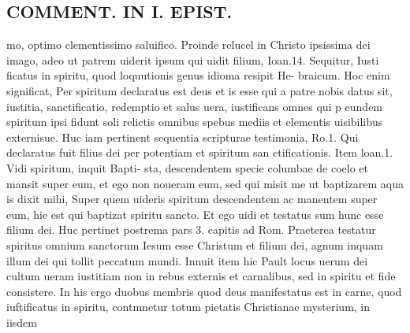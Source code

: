 \documentclass{article}
\begin{document}
\begin{pages}
\section*{COMMENT. IN I. EPIST. }\pstart mo, optimo clementissimo saluifico. Proinde relucel in Christo ipsissima dei imago, adeo ut patrem uiderit ipsum qui uidit filium, Ioan.14. Sequitur, Iusti ficatus in spiritu, quod loquutionis genus idioma resipit He- braicum. Hoc enim significat, Per spiritum declaratus est deus et is esse qui a patre nobis datus sit, iustitia, sanctificatio, redemptio et salus uera, iustificans omnes qui p eundem spiritum ipsi fidunt soli relictis omnibus spebus mediis et elementis uisibilibus externisue. Huc iam pertinent sequentia scripturae testimonia, Ro.1. Qui declaratus fuit filius dei per potentiam et spiritum san ctificationis. Item loan.1. Vidi spiritum, inquit Bapti- sta, descendentem specie columbae de coelo et mansit super eum, et ego non noueram eum, sed qui misit me ut baptizarem aqua is dixit mihi, Super quem uideris spiritum descendentem ac manentem super eum, hie est qui baptizat spiritu sancto. Et ego uidi et testatus sum hunc esse filium dei. Huc pertinet postrema pars 3. capitis ad Rom. Praeterea testatur spiritus omnium sanctorum Iesum esse Christum et filium dei, agnum inquam illum dei qui tollit peccatum mundi. Innuit item hic Pault locus uerum dei cultum ueram iustitiam non in rebus externis et carnalibus, sed in spiritu et fide consistere. In his ergo duobus membris quod deus manifestatus est in carne, quod iuftificatus in spiritu, contmnetur totum pietatis Christianae mysterium, in iisdem  \pend

\end{pages}
\end{document}
